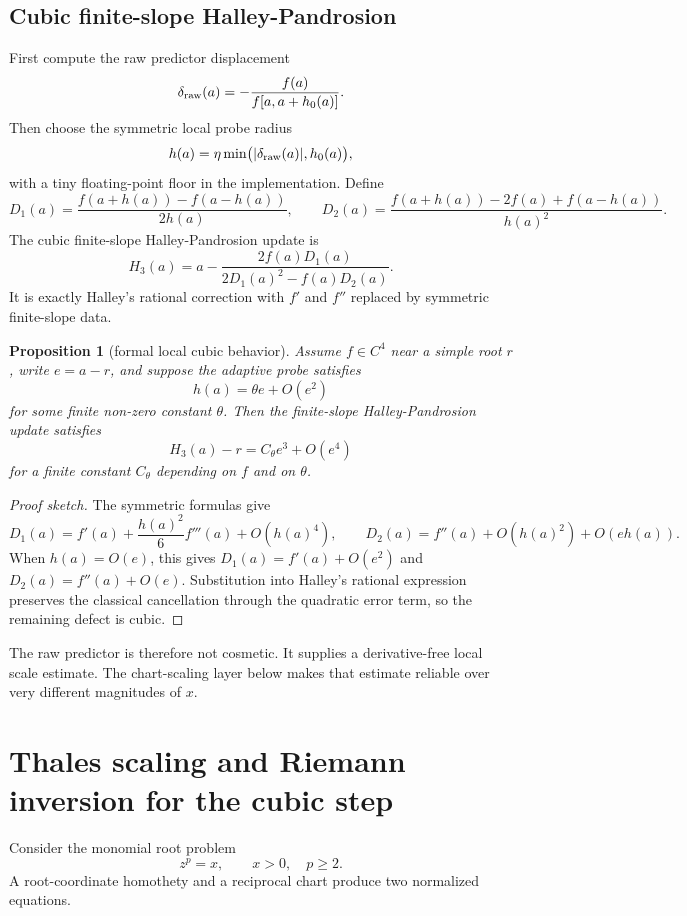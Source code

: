 \documentclass[11pt]{article}
\newtheorem{proposition}{Proposition}
\begin{document}
\subsection{Cubic finite-slope Halley-Pandrosion}
First compute the raw predictor displacement
\[
\delta_{\rm raw}(a)=-\frac{f(a)}{f[a,a+h_0(a)]}.
\]
Then choose the symmetric local probe radius
\[
h(a)=\eta\min\bigl(|\delta_{\rm raw}(a)|,h_0(a)\bigr),
\]
with a tiny floating-point floor in the implementation.  Define
\[
D_1(a)=\frac{f(a+h(a))-f(a-h(a))}{2h(a)},
\qquad
D_2(a)=\frac{f(a+h(a))-2f(a)+f(a-h(a))}{h(a)^2}.
\]
The cubic finite-slope Halley-Pandrosion update is
\begin{equation}
H_3(a)=a-\frac{2f(a)D_1(a)}{2D_1(a)^2-f(a)D_2(a)}.
\label{eq:H3}
\end{equation}
It is exactly Halley's rational correction with $f'$ and $f''$ replaced by symmetric finite-slope data.

\begin{proposition}[formal local cubic behavior]
Assume $f\in C^4$ near a simple root $r$, write $e=a-r$, and suppose the adaptive probe satisfies
\[
h(a)=\theta e+O(e^2)
\]
for some finite non-zero constant $\theta$.  Then the finite-slope Halley-Pandrosion update satisfies
\[
H_3(a)-r=C_\theta e^3+O(e^4)
\]
for a finite constant $C_\theta$ depending on $f$ and on $\theta$.
\end{proposition}

\begin{proof}[Proof sketch]
The symmetric formulas give
\[
D_1(a)=f'(a)+\frac{h(a)^2}{6}f'''(a)+O(h(a)^4),
\qquad
D_2(a)=f''(a)+O(h(a)^2)+O(eh(a)).
\]
When $h(a)=O(e)$, this gives $D_1(a)=f'(a)+O(e^2)$ and $D_2(a)=f''(a)+O(e)$.  Substitution into Halley's rational expression preserves the classical cancellation through the quadratic error term, so the remaining defect is cubic.
\end{proof}

The raw predictor is therefore not cosmetic.  It supplies a derivative-free local scale estimate.  The chart-scaling layer below makes that estimate reliable over very different magnitudes of $x$.

\section{Thales scaling and Riemann inversion for the cubic step}
Consider the monomial root problem
\[
z^p=x,\qquad x>0,\quad p\ge2.
\]
A root-coordinate homothety and a reciprocal chart produce two normalized equations.
\end{document}
